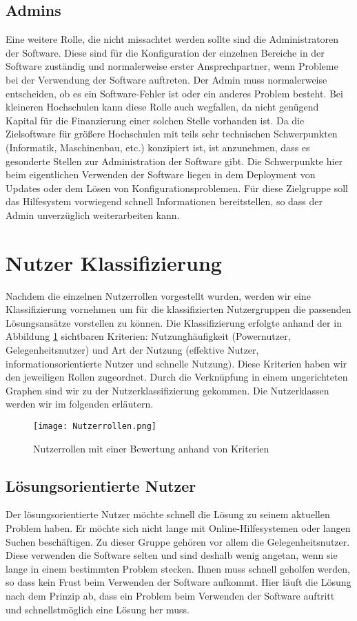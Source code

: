 \subsection{Admins}
Eine weitere Rolle, die nicht missachtet werden sollte sind die Administratoren der Software. Diese sind für die Konfiguration der einzelnen Bereiche in der Software zuständig und normalerweise erster Ansprechpartner, wenn Probleme bei der Verwendung der Software auftreten. Der Admin muss normalerweise entscheiden, ob es ein Software-Fehler ist oder ein anderes Problem besteht. Bei kleineren Hochschulen kann diese Rolle auch wegfallen, da nicht genügend Kapital für die Finanzierung einer solchen Stelle vorhanden ist. Da die Zielsoftware für größere Hochschulen mit teils sehr technischen Schwerpunkten (Informatik, Maschinenbau, etc.) konzipiert ist, ist anzunehmen, dass es gesonderte Stellen zur Administration der Software gibt. Die Schwerpunkte hier beim eigentlichen Verwenden der Software liegen in dem Deployment von Updates oder dem Lösen von Konfigurationsproblemen. Für diese Zielgruppe soll das Hilfesystem vorwiegend schnell Informationen bereitstellen, so dass der Admin unverzüglich weiterarbeiten kann.

\section{Nutzer Klassifizierung}
Nachdem die einzelnen Nutzerrollen vorgestellt wurden, werden wir eine Klassifizierung vornehmen um für die klassifizierten Nutzergruppen die passenden Lösungsansätze vorstellen zu können. Die Klassifizierung erfolgte anhand der in Abbildung \ref{img1:userRoles} sichtbaren Kriterien: Nutzunghäufigkeit (Powernutzer, Gelegenheitsnutzer) und Art der Nutzung (effektive Nutzer, informationsorientierte Nutzer und schnelle Nutzung). Diese Kriterien haben wir den jeweiligen Rollen zugeordnet. Durch die Verknüpfung in einem ungerichteten Graphen sind wir zu der Nutzerklassifizierung gekommen. Die Nutzerklassen werden wir im folgenden erläutern.
\begin{figure}[ht]
\begin{center}
\texttt{[image: Nutzerrollen.png]}
\caption{Nutzerrollen mit einer Bewertung anhand von Kriterien}
\label{img1:userRoles}
\end{center}
\end{figure} 

\subsection{Lösungsorientierte Nutzer}
Der lösungsorientierte Nutzer möchte schnell die Lösung zu seinem aktuellen Problem haben. Er möchte sich nicht lange mit Online-Hilfesystemen oder langen Suchen beschäftigen. Zu dieser Gruppe gehören vor allem die Gelegenheitsnutzer. Diese verwenden die Software selten und sind deshalb wenig angetan, wenn sie lange in einem bestimmten Problem stecken. Ihnen muss schnell geholfen werden, so dass kein Frust beim Verwenden der Software aufkommt. Hier läuft die Lösung nach dem Prinzip ab, dass ein Problem beim Verwenden der Software auftritt und schnellstmöglich eine Lösung her muss. 
